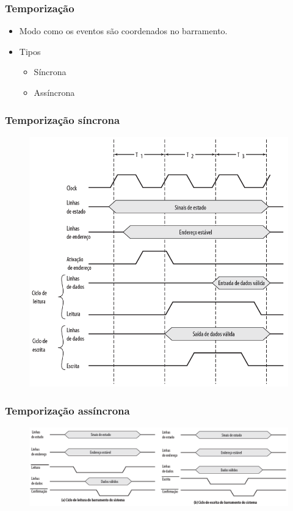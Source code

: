 \documentclass[aspectratio=169,
				xcolor=table]{beamer}
\begin{document}
	\begin{frame}
		\frametitle{Temporização}
		\begin{itemize}
			\item Modo como os eventos são coordenados no barramento.
			\vspace{1em}
			\item Tipos
			\begin{itemize}
				\item Síncrona
				\item Assíncrona
			\end{itemize}
			
		\end{itemize}
	\end{frame}
	
	\begin{frame}
		\frametitle{Temporização síncrona}
		\begin{figure}[hbtp]
		\centering
		\includegraphics[height=.75\textheight]{../figs/cap11/sincrono.png}
		\end{figure}
	\end{frame}
	
	\begin{frame}
		\frametitle{Temporização assíncrona}
		\begin{figure}[hbtp]
		\centering
		\includegraphics[width=.95\textwidth]{../figs/cap11/assincrono.png}
		\end{figure}
	\end{frame}
	
\end{document}
